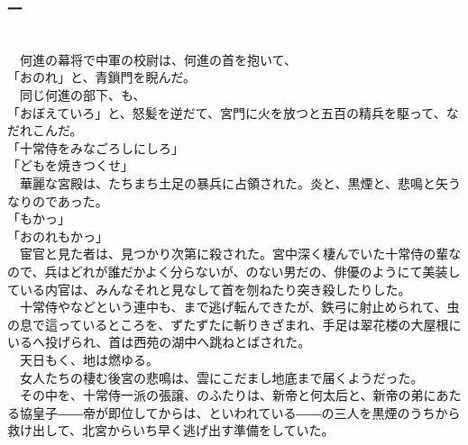 \documentclass[
  paper=a5,
  fontsize=10pt,
  jafontsize=9.5pt,
  tate,                  %
  open_bracket_pos=nibu, %
]{jlreq}
\begin{document}
\subsubsection{一}

\\


　何進の幕将で中軍の校尉は、何進の首を抱いて、\\


「おのれ」と、青鎖門を睨んだ。\\


　同じ何進の部下、も、\\


「おぼえていろ」と、怒髪を逆だて、宮門に火を放つと五百の精兵を駆って、なだれこんだ。\\


「十常侍をみなごろしにしろ」\\


「どもを焼きつくせ」\\


　華麗な宮殿は、たちまち土足の暴兵に占領された。炎と、黒煙と、悲鳴と矢うなりのであった。\\


「もかっ」\\


「おのれもかっ」\\


　宦官と見た者は、見つかり次第に殺された。宮中深く棲んでいた十常侍の輩なので、兵はどれが誰だかよく分らないが、のない男だの、俳優のようにて美装している内官は、みんなそれと見なして首を刎ねたり突き殺したりした。\\


　十常侍やなどという連中も、まで逃げ転んできたが、鉄弓に射止められて、虫の息で這っているところを、ずたずたに斬りきざまれ、手足は翠花楼の大屋根にいるへ投げられ、首は西苑の湖中へ跳ねとばされた。\\


　天日もく、地は燃ゆる。\\


　女人たちの棲む後宮の悲鳴は、雲にこだまし地底まで届くようだった。\\


　その中を、十常侍一派の張譲、のふたりは、新帝と何太后と、新帝の弟にあたる協皇子――帝が即位してからは、といわれている――の三人を黒煙のうちから救け出して、北宮からいち早く逃げ出す準備をしていた。\\
\end{document}
